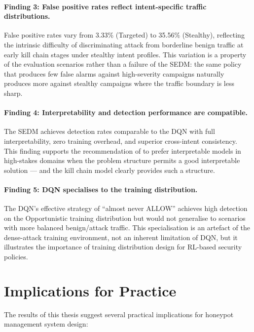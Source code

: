 \paragraph{Finding 3: False positive rates reflect intent-specific traffic distributions.}
False positive rates vary from 3.33\% (Targeted) to 35.56\% (Stealthy),
reflecting the intrinsic difficulty of discriminating attack from borderline
benign traffic at early kill chain stages under stealthy intent profiles.
This variation is a property of the evaluation scenarios rather than a failure
of the SEDM: the same policy that produces few false alarms against
high-severity campaigns naturally produces more against stealthy campaigns
where the traffic boundary is less sharp.

\paragraph{Finding 4: Interpretability and detection performance are compatible.}
The SEDM achieves detection rates comparable to the DQN with full
interpretability, zero training overhead, and superior cross-intent
consistency.
This finding supports the recommendation of \citet{rudin2019stop} to prefer
interpretable models in high-stakes domains when the problem structure permits
a good interpretable solution --- and the kill chain model clearly provides
such a structure.

\paragraph{Finding 5: DQN specialises to the training distribution.}
The DQN's effective strategy of ``almost never ALLOW'' achieves high
detection on the Opportunistic training distribution but would not generalise
to scenarios with more balanced benign/attack traffic.
This specialisation is an artefact of the dense-attack training environment,
not an inherent limitation of DQN, but it illustrates the importance of
training distribution design for RL-based security policies.

\section{Implications for Practice}

The results of this thesis suggest several practical implications for
honeypot management system design:

